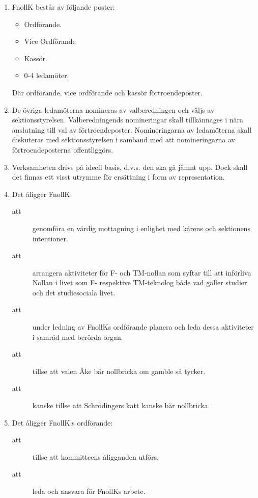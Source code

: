 \documentclass[11pt,a4paper]{article}
\begin{document}
\begin{enumerate}[\thesubsection .1]

  \item FnollK består av följande poster:
    \begin{itemize}
      \item Ordförande.
      \item Vice Ordförande
      \item Kassör.
      \item 0-4 ledamöter.
    \end{itemize}

  Där ordförande, vice ordförande och  kassör förtroendeposter.
  

\item De övriga ledamöterna nomineras av valberedningen och väljs av sektionsstyrelsen. Valberedningends nomineringar skall tillkännages i nära anslutning till val av förtroendeposter. Nomineringarna av ledamöterna skall diskuteras med sektionsstyrelsen i samband med att nomineringarna av förtroendeposterna offentliggörs. 

  \item Verksamheten drivs på ideell basis, d.v.s. den ska gå jämnt
  upp. Dock skall det finnas ett visst utrymme för ersättning i form
  av representation.

  \item Det åligger FnollK:
    \begin{description}
      \item[att] genomföra en värdig mottagning i enlighet med kårens och sektionens intentioner.
      \item[att] arrangera aktiviteter för F- och TM-nollan som syftar till
      att införliva Nollan i livet som F- respektive TM-teknolog både vad gäller
      studier och det studiesociala livet.
      \item[att] under ledning av FnollKs  ordförande planera och leda dessa aktiviteter i samråd med berörda organ.
      \item[att] tillse att valen Åke bär nollbricka om gamble så
      tycker.
      \item[att] kanske tillse att Schrödingers katt kanske bär nollbricka.
    \end{description}

  \item Det åligger FnollK:s ordförande:
    \begin{description}
      \item[att] tillse att kommitteens åligganden utförs.
      \item[att] leda och ansvara för FnollKs arbete.
     

\end{description}
\end{enumerate}
\end{document}
